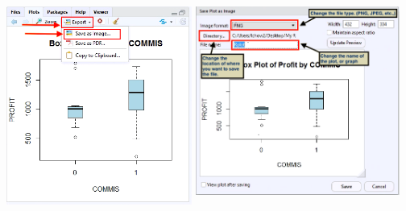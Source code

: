 \documentclass[a4paper]{report}
\begin{document}
\begin{flushleft}
                    \includegraphics[width=2.40in,height=2.63in]{images/SAVE2.png}
                    \includegraphics[width=2.63in,height=2.75in]{images/SAVE3.png}
    

\end{flushleft}
\end{document}

